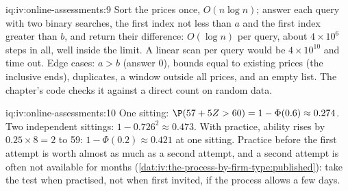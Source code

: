 \begin{solution}{iq:iv:online-assessments:9}
Sort the prices once, $O(n \log n)$; answer each query with two binary searches, the first index not less
than $a$ and the first index greater than $b$, and return their difference: $O(\log n)$ per query, about
$4 \times 10^6$ steps in all, well inside the limit. A linear scan per query would be $4 \times 10^{10}$ and
time out. Edge cases: $a > b$ (answer 0), bounds equal to existing prices (the inclusive ends), duplicates, a
window outside all prices, and an empty list. The chapter's code checks it against a direct count on random
data.
\end{solution}

\begin{solution}{iq:iv:online-assessments:10}
One sitting: $\P(57 + 5Z > 60) = 1 - \Phi(0.6) \approx 0.274$. Two independent sittings: $1 - 0.726^2 \approx
0.473$. With practice, ability rises by $0.25 \times 8 = 2$ to 59: $1 - \Phi(0.2) \approx 0.421$ at one
sitting. Practice before the first attempt is worth almost as much as a second attempt, and a second attempt
is often not available for months (\cref{dat:iv:the-process-by-firm-type:published}): take the test when
practised, not when first invited, if the process allows a few days.
\end{solution}
